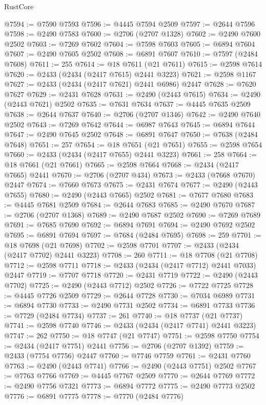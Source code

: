 \begin{lexlean}{RustCore}
\begin{coremodule}
@7594 := @7590 @7593
@7596 := @4445 @7594 @2509
@7597 := @2644 @7596
@7598 := @2490 @7583
@7600 := @2706 (@2707 @1328)
@7602 := @2490 @7600 @2502
@7603 := @7269 @7602
@7604 := @7598 @7603
@7605 := @6894 @7604
@7607 := @2490 @7605 @2502
@7608 := @6891 @7607
@7610 := @7597 (@2484 @7608)
@7611 := 255
@7614 := @18 @7611 (@21 @7611)
@7615 := @2598 @7614
@7620 := @2433 (@2434 (@2417 @7615) @2441 @3223)
@7621 := @2598 @1167
@7627 := @2433 (@2434 (@2417 @7621) @2441 @6986) @2447
@7628 := @7620 @7627
@7629 := @2431 @7628
@7631 := @2490 (@2443 @7615)
@7634 := @2490 (@2443 @7621) @2502
@7635 := @7631 @7634
@7637 := @4445 @7635 @2509
@7638 := @2644 @7637
@7640 := @2706 (@2707 @1346)
@7642 := @2490 @7640 @2502
@7643 := @7269 @7642
@7644 := @6987 @7643
@7645 := @6894 @7644
@7647 := @2490 @7645 @2502
@7648 := @6891 @7647
@7650 := @7638 (@2484 @7648)
@7651 := 257
@7654 := @18 @7651 (@21 @7651)
@7655 := @2598 @7654
@7660 := @2433 (@2434 (@2417 @7655) @2441 @3223)
@7661 := 258
@7664 := @18 @7661 (@21 @7661)
@7665 := @2598 @7664
@7668 := @2434 (@2417 @7665) @2441
@7670 := @2706 (@2707 @434)
@7673 := @2433 (@7668 @7670) @2447
@7674 := @7660 @7673
@7675 := @2431 @7674
@7677 := @2490 (@2443 @7655)
@7680 := @2490 (@2443 @7665) @2502
@7681 := @7677 @7680
@7683 := @4445 @7681 @2509
@7684 := @2644 @7683
@7685 := @2490 @7670
@7687 := @2706 (@2707 @1368)
@7689 := @2490 @7687 @2502
@7690 := @7269 @7689
@7691 := @7685 @7690
@7692 := @6894 @7691
@7694 := @2490 @7692 @2502
@7695 := @6891 @7694
@7697 := @7684 (@2484 @7695)
@7698 := 259
@7701 := @18 @7698 (@21 @7698)
@7702 := @2598 @7701
@7707 := @2433 (@2434 (@2417 @7702) @2441 @3223)
@7708 := 260
@7711 := @18 @7708 (@21 @7708)
@7712 := @2598 @7711
@7718 := @2433 (@2434 (@2417 @7712) @2441 @7033) @2447
@7719 := @7707 @7718
@7720 := @2431 @7719
@7722 := @2490 (@2443 @7702)
@7725 := @2490 (@2443 @7712) @2502
@7726 := @7722 @7725
@7728 := @4445 @7726 @2509
@7729 := @2644 @7728
@7730 := @7034 @6989
@7731 := @6894 @7730
@7733 := @2490 @7731 @2502
@7734 := @6891 @7733
@7736 := @7729 (@2484 @7734)
@7737 := 261
@7740 := @18 @7737 (@21 @7737)
@7741 := @2598 @7740
@7746 := @2433 (@2434 (@2417 @7741) @2441 @3223)
@7747 := 262
@7750 := @18 @7747 (@21 @7747)
@7751 := @2598 @7750
@7754 := @2434 (@2417 @7751) @2441
@7756 := @2706 (@2707 @1392)
@7759 := @2433 (@7754 @7756) @2447
@7760 := @7746 @7759
@7761 := @2431 @7760
@7763 := @2490 (@2443 @7741)
@7766 := @2490 (@2443 @7751) @2502
@7767 := @7763 @7766
@7769 := @4445 @7767 @2509
@7770 := @2644 @7769
@7772 := @2490 @7756 @7321
@7773 := @6894 @7772
@7775 := @2490 @7773 @2502
@7776 := @6891 @7775
@7778 := @7770 (@2484 @7776)

\end{coremodule}
\end{lexlean}
